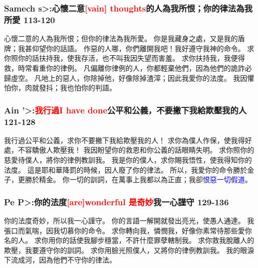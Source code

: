 \subsubsection{Samech  \<s>:心懷二意\textcolor{red}{[vain] thoughts}的人為我所恨；你的律法為我所愛 113-120}
心懷二意的人為我所恨；但你的律法為我所愛。
你是我藏身之處，又是我的盾牌；我甚仰望你的話語。
作惡的人哪，你們離開我吧！我好遵守我神的命令。
求你照你的話扶持我，使我存活，也不叫我因失望而害羞。
求你扶持我，我便得救，時常看重你的律例。
凡偏離你律例的人，你都輕棄他們，因為他們的詭詐必歸虛空。
凡地上的惡人，你除掉他，好像除掉渣滓；因此我愛你的法度。
我因懼怕你，肉就發抖；我也怕你的判語。


\subsubsection{Ain  \<'>:\textcolor{red}{我行過I have done}公平和公義，不要撇下我給欺壓我的人 121-128 }
我行過公平和公義，求你不要撇下我給欺壓我的人！
求你為僕人作保，使我得好處，不容驕傲人欺壓我！
我因盼望你的救恩和你公義的話眼睛失明。
求你照你的慈愛待僕人，將你的律例教訓我。
我是你的僕人，求你賜我悟性，使我得知你的法度。
這是耶和華降罰的時候，因人廢了你的律法。
所以，我愛你的命令勝於金子，更勝於精金。
你一切的訓詞，在萬事上我都以為正直；我卻\textcolor{blue}{恨惡一切假道}。

\subsubsection{Pe  \<P>:你的法度\textcolor{red}{[are]wonderful 是奇妙}我一心謹守 129-136}
你的法度奇妙，所以我一心謹守。
你的言語一解開就發出亮光，使愚人通達。
我張口而氣喘，因我切慕你的命令。
求你轉向我，憐憫我，好像你素常待那些愛你名的人。
求你用你的話使我腳步穩當，不許什麼罪孽轄制我。
求你救我脫離人的欺壓，我要遵守你的訓詞。
求你用臉光照僕人，又將你的律例教訓我。
我的眼淚下流成河，因為他們不守你的律法。



